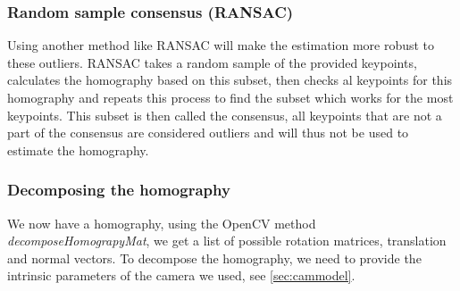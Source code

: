 \subsubsection{Random sample consensus (RANSAC)}
Using another method like RANSAC will make the estimation more robust to these outliers. RANSAC takes a random sample of the provided keypoints, calculates the homography based on this subset, then checks al keypoints for this homography and repeats this process to find the subset which works for the most keypoints. This subset is then called the consensus, all keypoints that are not a part of the consensus are considered outliers and will thus not be used to estimate the homography. 

\subsubsection{Decomposing the homography}
We now have a homography, using the OpenCV method \textit{decomposeHomograpyMat}, we get a list of possible rotation matrices, translation and normal vectors. To decompose the homography, we need to provide the intrinsic parameters of the camera we used, see \autoref{sec:cammodel}.
